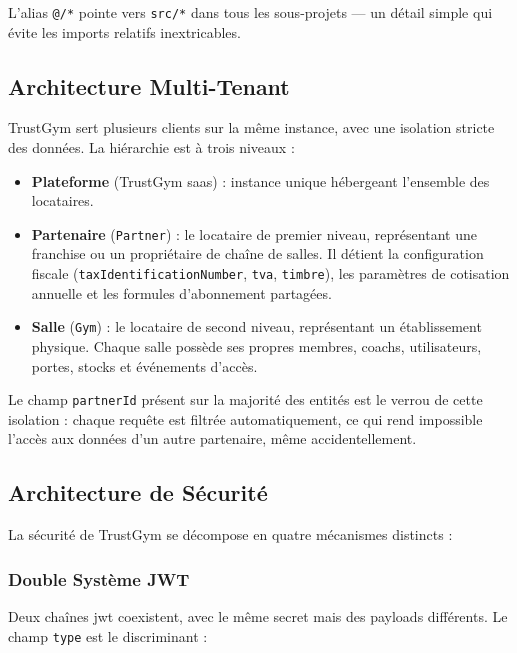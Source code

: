 \documentclass[../main.tex]{subfiles}
\begin{document}
L'alias \texttt{@/*} pointe vers \texttt{src/*} dans tous les sous-projets --- un d\'{e}tail simple qui \'{e}vite les imports relatifs inextricables.

\subsection{Architecture Multi-Tenant}

TrustGym sert plusieurs clients sur la m\^{e}me instance, avec une isolation stricte des donn\'{e}es. La hi\'{e}rarchie est \`{a} trois niveaux :

\begin{itemize}
    \item \textbf{Plateforme} (TrustGym \acrshort{saas}) : instance unique h\'{e}bergeant l'ensemble des locataires.
    \item \textbf{Partenaire} (\texttt{Partner}) : le locataire de premier niveau, repr\'{e}sentant une franchise ou un propri\'{e}taire de cha\^{i}ne de salles. Il d\'{e}tient la configuration fiscale (\texttt{taxIdentificationNumber}, \texttt{tva}, \texttt{timbre}), les param\`{e}tres de cotisation annuelle et les formules d'abonnement partag\'{e}es.
    \item \textbf{Salle} (\texttt{Gym}) : le locataire de second niveau, repr\'{e}sentant un \'{e}tablissement physique. Chaque salle poss\`{e}de ses propres membres, coachs, utilisateurs, portes, stocks et \'{e}v\'{e}nements d'acc\`{e}s.
\end{itemize}

Le champ \texttt{partnerId} pr\'{e}sent sur la majorit\'{e} des entit\'{e}s est le verrou de cette isolation : chaque requ\^{e}te est filtr\'{e}e automatiquement, ce qui rend impossible l'acc\`{e}s aux donn\'{e}es d'un autre partenaire, m\^{e}me accidentellement.

\subsection{Architecture de S\'{e}curit\'{e}}

La s\'{e}curit\'{e} de TrustGym se d\'{e}compose en quatre m\'{e}canismes distincts :

\subsubsection{Double Syst\`{e}me JWT}

Deux cha\^{i}nes \acrshort{jwt} \cite{jwt_rfc7519} coexistent, avec le m\^{e}me secret mais des payloads diff\'{e}rents. Le champ \texttt{type} est le discriminant :
\end{document}
